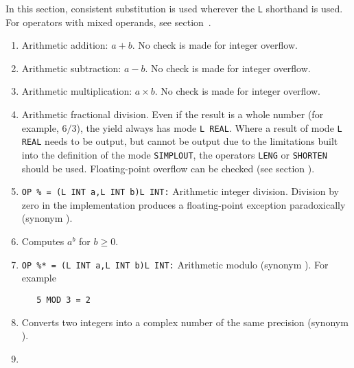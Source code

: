 In this section, consistent substitution is used wherever the \verb|L|
shorthand is used. For operators with mixed operands, see
section~.
\begin{enumerate}
\item {}\newline
Arithmetic addition: $a+b$. No check is made for integer overflow.
\item {}\newline
Arithmetic subtraction: $a-b$. No check is made for integer
overflow.
\item {}\newline
Arithmetic multiplication: $a\times b$. No check is made for
integer overflow.
\item {}\newline
Arithmetic fractional division. Even if the result is a whole number
(for example, $6/3$), the yield always has mode \verb|L REAL|. Where a
result of mode \verb|L REAL| needs to be output, but cannot be output
due to the limitations built into the definition of the mode
\verb|SIMPLOUT|, the operators \verb|LENG| or \verb|SHORTEN| should be
used. Floating-point overflow can be checked (see
section ).
\item \verb|OP % = (L INT a,L INT b)L INT:|\newline
Arithmetic integer division. Division by zero in the
implementation produces a floating-point exception paradoxically
(synonym ).
\item {}\newline
Computes $a^b$ for $b\geq0$.
\item \verb|OP %* = (L INT a,L INT b)L INT:|\newline
Arithmetic modulo (synonym ). For example
\begin{verbatim}
   5 MOD 3 = 2
\end{verbatim}
\item {}\newline
Converts two integers into a complex number of the same precision
(synonym ).
\item {}\newline

\end{enumerate}
